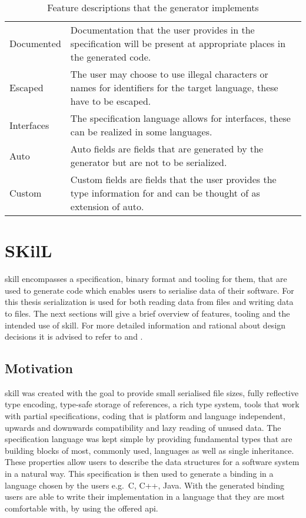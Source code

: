 \documentclass[thesis]{subfiles}
\begin{document}
  \begin{table}
    \begin{tabu}to\linewidth{lX}
      Documented
       & Documentation that the user provides in the specification will be present at appropriate places in the generated code.\autocite{skill-tr}    \\
      Escaped
       & The user may choose to use illegal characters or names for identifiers for the target language, these have to be escaped.\autocite{skill-tr} \\
      Interfaces
       & The specification language allows for interfaces, these can be realized in some languages.\autocite{skill-tr}                                \\
      Auto
       & Auto fields are fields that are generated by the generator but are not to be serialized.\autocite{skill-tr}                                  \\
      Custom
       & Custom fields are fields that the user provides the type information for and can be thought of as extension of auto.\autocite{skill-tr}      \\
    \end{tabu}
    \caption{Feature descriptions that the generator implements}\label{tab:feat}
  \end{table}

\section{SKilL}\label{sec:skill}
  \gls{skill} encompasses a specification, binary format and tooling for them, that are used to generate code which enables users to serialise data of their software.
  For this thesis serialization is used for both reading data from files and writing data to files.
  The next sections will give a brief overview of features, tooling and the intended use of \gls{skill}.
  For more detailed information and rational about design decisions it is advised to refer to \autocite{skill-tr} and \autocite{skill-dis}.

  \subsection{Motivation}
    \gls{skill} was created with the goal to provide small serialised file sizes, fully reflective type encoding, type-safe storage of references, a rich type system, tools that work with partial specifications,
    coding that is platform and language independent, upwards and downwards compatibility and lazy reading of unused data.
    The specification language was kept simple by providing fundamental types that are building blocks of most, commonly used, languages as well as single inheritance.
    These properties allow users to describe the data structures for a software system in a natural way.
    This specification is then used to generate a binding in a language chosen by the users e.g.~C, C++, Java.
    With the generated binding users are able to write their implementation in a language that they are most comfortable with, by using the offered \gls{api}.%
    ~\autocite{skill-tr}
\end{document}
